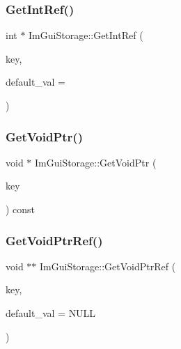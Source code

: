 \mbox{\label{struct_im_gui_storage_a28673fa7839263f3066ccb8e93e748a9}} 
\subsubsection{\texorpdfstring{Get\+Int\+Ref()}{GetIntRef()}}
{\footnotesize\ttfamily int $\ast$ Im\+Gui\+Storage\+::\+Get\+Int\+Ref (\begin{DoxyParamCaption}\item[{\mbox{\hyperlink{imgui_8h_a1785c9b6f4e16406764a85f32582236f}{Im\+Gui\+ID}}}]{key,  }\item[{int}]{default\+\_\+val = {} }\end{DoxyParamCaption})}

\mbox{\label{struct_im_gui_storage_aaf87a98ede89da09113b0189f6d878ca}} 
\subsubsection{\texorpdfstring{Get\+Void\+Ptr()}{GetVoidPtr()}}
{\footnotesize\ttfamily void $\ast$ Im\+Gui\+Storage\+::\+Get\+Void\+Ptr (\begin{DoxyParamCaption}\item[{\mbox{\hyperlink{imgui_8h_a1785c9b6f4e16406764a85f32582236f}{Im\+Gui\+ID}}}]{key }\end{DoxyParamCaption}) const}

\mbox{\label{struct_im_gui_storage_a2b203317f3f488818e9b9f416fe35332}} 
\subsubsection{\texorpdfstring{Get\+Void\+Ptr\+Ref()}{GetVoidPtrRef()}}
{\footnotesize\ttfamily void $\ast$$\ast$ Im\+Gui\+Storage\+::\+Get\+Void\+Ptr\+Ref (\begin{DoxyParamCaption}\item[{\mbox{\hyperlink{imgui_8h_a1785c9b6f4e16406764a85f32582236f}{Im\+Gui\+ID}}}]{key,  }\item[{void $\ast$}]{default\+\_\+val = {\ttfamily NULL} }\end{DoxyParamCaption})}

